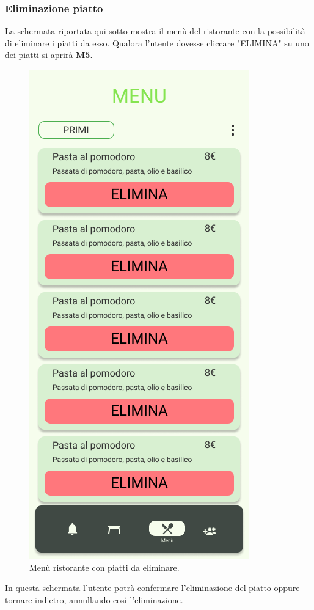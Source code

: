 \subsubsection{Eliminazione piatto}
La schermata riportata qui sotto mostra il menù del ristorante con la possibilità di eliminare i piatti da esso. Qualora l'utente dovesse cliccare "ELIMINA" su uno dei piatti si aprirà \textbf{M5}.
\begin{figure}[H]
  \centering
  \includegraphics[scale=0.6]{img/mock-up/Dish_deletion.png}
  \caption{Menù ristorante con piatti da eliminare.}
\end{figure}
\newpage
In questa schermata l'utente potrà confermare l'eliminazione del piatto oppure tornare indietro, annullando così l'eliminazione.
